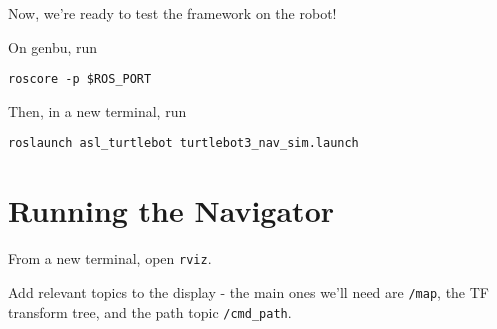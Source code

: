 \documentclass{article}
\begin{document}
Now, we're ready to test the framework on the robot!




On genbu, run

\begin{verbatim}
roscore -p $ROS_PORT
\end{verbatim}

Then, in a new terminal, run

\begin{verbatim}
roslaunch asl_turtlebot turtlebot3_nav_sim.launch
\end{verbatim}

\section{Running the Navigator}

From a new terminal, open \texttt{rviz}. 

Add relevant topics to the display - the main ones we'll need are \texttt{/map}, the TF transform tree, and the path topic \texttt{/cmd\_path}.
\end{document}
